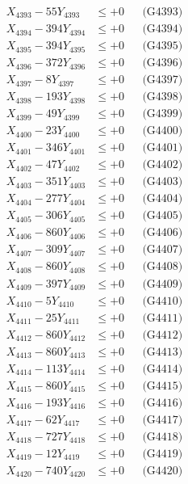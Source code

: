\documentclass[a4paper,10pt]{article}
\begin{document}
{\begin{align}
X_{4393} - 55Y_{4393} &\leq +0 && \text{(G4393)} \\
X_{4394} - 394Y_{4394} &\leq +0 && \text{(G4394)} \\
X_{4395} - 394Y_{4395} &\leq +0 && \text{(G4395)} \\
X_{4396} - 372Y_{4396} &\leq +0 && \text{(G4396)} \\
X_{4397} - 8Y_{4397} &\leq +0 && \text{(G4397)} \\
X_{4398} - 193Y_{4398} &\leq +0 && \text{(G4398)} \\
X_{4399} - 49Y_{4399} &\leq +0 && \text{(G4399)} \\
X_{4400} - 23Y_{4400} &\leq +0 && \text{(G4400)} \\
\allowbreak
X_{4401} - 346Y_{4401} &\leq +0 && \text{(G4401)} \\
X_{4402} - 47Y_{4402} &\leq +0 && \text{(G4402)} \\
X_{4403} - 351Y_{4403} &\leq +0 && \text{(G4403)} \\
X_{4404} - 277Y_{4404} &\leq +0 && \text{(G4404)} \\
X_{4405} - 306Y_{4405} &\leq +0 && \text{(G4405)} \\
X_{4406} - 860Y_{4406} &\leq +0 && \text{(G4406)} \\
X_{4407} - 309Y_{4407} &\leq +0 && \text{(G4407)} \\
X_{4408} - 860Y_{4408} &\leq +0 && \text{(G4408)} \\
X_{4409} - 397Y_{4409} &\leq +0 && \text{(G4409)} \\
X_{4410} - 5Y_{4410} &\leq +0 && \text{(G4410)} \\
\allowbreak
X_{4411} - 25Y_{4411} &\leq +0 && \text{(G4411)} \\
X_{4412} - 860Y_{4412} &\leq +0 && \text{(G4412)} \\
X_{4413} - 860Y_{4413} &\leq +0 && \text{(G4413)} \\
X_{4414} - 113Y_{4414} &\leq +0 && \text{(G4414)} \\
X_{4415} - 860Y_{4415} &\leq +0 && \text{(G4415)} \\
X_{4416} - 193Y_{4416} &\leq +0 && \text{(G4416)} \\
X_{4417} - 62Y_{4417} &\leq +0 && \text{(G4417)} \\
X_{4418} - 727Y_{4418} &\leq +0 && \text{(G4418)} \\
X_{4419} - 12Y_{4419} &\leq +0 && \text{(G4419)} \\
X_{4420} - 740Y_{4420} &\leq +0 && \text{(G4420)} \\

\end{align}}
\end{document}
